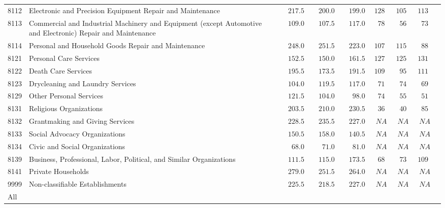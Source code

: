 \documentclass[9pt, oneside]{article}   	%
\begin{document}
\begin{longtable}{lp{3.5 in}ccccccc}
8112  & Electronic and Precision Equipment Repair and Maintenance & $\phantom{00}217.5$ & $\phantom{00}200.0$ & $\phantom{00}199.0$ & $128$ & $105$ & $113$ \\
8113  & Commercial and Industrial Machinery and Equipment (except Automotive and Electronic) Repair and Maintenance & $\phantom{00}109.0$ & $\phantom{00}107.5$ & $\phantom{00}117.0$ & $\phantom{0}78$ & $\phantom{0}56$ & $\phantom{0}73$ \\
8114  & Personal and Household Goods Repair and Maintenance & $\phantom{00}248.0$ & $\phantom{00}251.5$ & $\phantom{00}223.0$ & $107$ & $115$ & $\phantom{0}88$ \\
8121  & Personal Care Services & $\phantom{00}152.5$ & $\phantom{00}150.0$ & $\phantom{00}161.5$ & $127$ & $125$ & $131$ \\
8122  & Death Care Services & $\phantom{00}195.5$ & $\phantom{00}173.5$ & $\phantom{00}191.5$ & $109$ & $\phantom{0}95$ & $111$ \\
8123  & Drycleaning and Laundry Services & $\phantom{00}104.0$ & $\phantom{00}119.5$ & $\phantom{00}117.0$ & $\phantom{0}71$ & $\phantom{0}74$ & $\phantom{0}69$ \\
8129  & Other Personal Services & $\phantom{00}121.5$ & $\phantom{00}104.0$ & $\phantom{000}98.0$ & $\phantom{0}74$ & $\phantom{0}55$ & $\phantom{0}51$ \\
8131  & Religious Organizations & $\phantom{00}203.5$ & $\phantom{00}210.0$ & $\phantom{00}230.5$ & $\phantom{0}36$ & $\phantom{0}40$ & $\phantom{0}85$ \\
8132  & Grantmaking and Giving Services & $\phantom{00}228.5$ & $\phantom{00}235.5$ & $\phantom{00}227.0$ & $\phantom{0}NA$ & $\phantom{0}NA$ & $\phantom{0}NA$ \\
8133  & Social Advocacy Organizations & $\phantom{00}150.5$ & $\phantom{00}158.0$ & $\phantom{00}140.5$ & $\phantom{0}NA$ & $\phantom{0}NA$ & $\phantom{0}NA$ \\
8134  & Civic and Social Organizations & $\phantom{000}68.0$ & $\phantom{000}71.0$ & $\phantom{000}81.0$ & $\phantom{0}NA$ & $\phantom{0}NA$ & $\phantom{0}NA$ \\
8139  & Business, Professional, Labor, Political, and Similar Organizations & $\phantom{00}111.5$ & $\phantom{00}115.0$ & $\phantom{00}173.5$ & $\phantom{0}68$ & $\phantom{0}73$ & $109$ \\
8141  & Private Households & $\phantom{00}279.0$ & $\phantom{00}251.5$ & $\phantom{00}264.0$ & $\phantom{0}NA$ & $\phantom{0}NA$ & $\phantom{0}NA$ \\
9999  & Non-classifiable Establishments & $\phantom{00}225.5$ & $\phantom{00}218.5$ & $\phantom{00}227.0$ & $\phantom{0}NA$ & $\phantom{0}NA$ & $\phantom{0}NA$ \\
\cline{1-1} \cline{2-2} \cline{3-3} \cline{4-4} \cline{5-5} \cline{6-6} \cline{7-7} \cline{8-8} \cline{9-9} %
All  &  &  &  &  &  &  &  \\
\hline 
\end{longtable}
\end{document}

